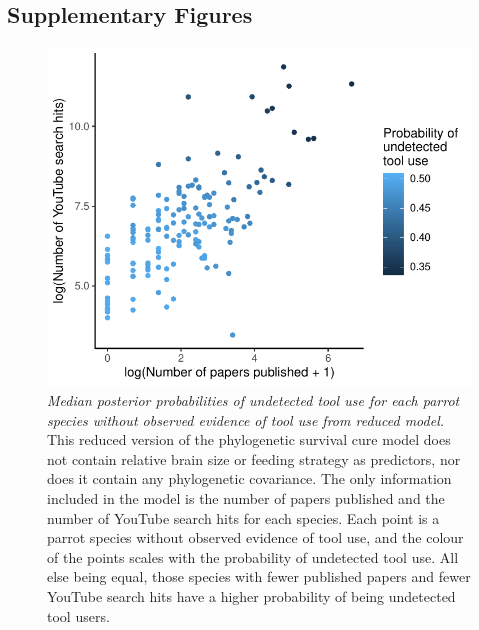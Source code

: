 \documentclass[
  man,floatsintext]{apa6}
\begin{document}
\hypertarget{supplementary-figures}{%
\subsection{Supplementary Figures}\label{supplementary-figures}}



\begin{figure}
\centering
\includegraphics{manuscript_files/figure-latex/plotSurvCure3-1.pdf}
\caption{\label{fig:plotSurvCure3}\emph{Median posterior probabilities of undetected tool use for each parrot species without observed evidence of tool use from reduced model.} This reduced version of the phylogenetic survival cure model does not contain relative brain size or feeding strategy as predictors, nor does it contain any phylogenetic covariance. The only information included in the model is the number of papers published and the number of YouTube search hits for each species. Each point is a parrot species without observed evidence of tool use, and the colour of the points scales with the probability of undetected tool use. All else being equal, those species with fewer published papers and fewer YouTube search hits have a higher probability of being undetected tool users.}
\end{figure}

\newpage
\end{document}
